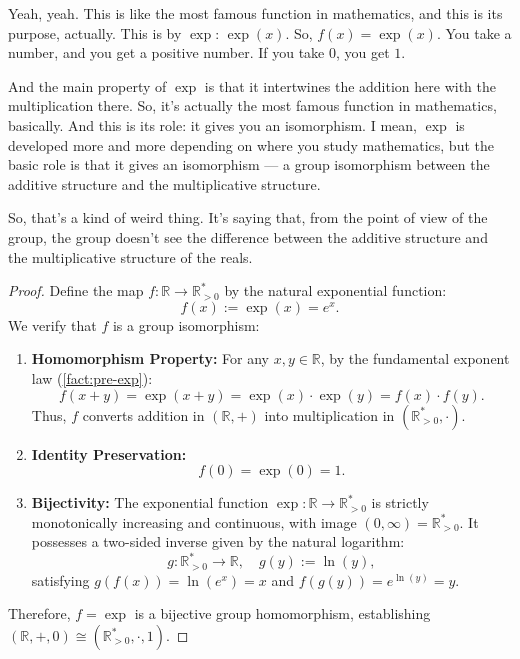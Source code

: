 \begin{speech}[00:18:32 - 00:19:27]
Yeah, yeah. This is like the most famous function in mathematics, and this is its purpose, actually. This is by $\exp$:  $\exp(x)$. So, $f(x) = \exp(x)$.  You take a number, and you get a positive number. If you take $0$, you get $1$.

And the main property of $\exp$ is that it intertwines the addition here with the multiplication there. So, it's actually the most famous function in mathematics, basically. And this is its role: it gives you an isomorphism. I mean, $\exp$ is developed more and more depending on where you study mathematics, but the basic role is that it gives an isomorphism --- a group isomorphism between the additive structure and the multiplicative structure.

So, that's a kind of weird thing. It's saying that, from the point of view of the group, the group doesn't see the difference between the additive structure and the multiplicative structure of the reals.
\end{speech}

\begin{content}

\begin{proof}
Define the map $f \colon \mathbb{R} \to \mathbb{R}^*_{>0}$ by the natural exponential function:
\[
f(x) := \exp(x) = e^x.
\]
We verify that $f$ is a group isomorphism:
\begin{enumerate}[label=\textbf{(\roman*)}]
    \item \textbf{Homomorphism Property:} For any $x, y \in \mathbb{R}$, by the fundamental exponent law (\cref{fact:pre-exp}):
    \[
    f(x + y) = \exp(x + y) = \exp(x) \cdot \exp(y) = f(x) \cdot f(y).
    \]
    Thus, $f$ converts addition in $(\mathbb{R}, +)$ into multiplication in $(\mathbb{R}^*_{>0}, \cdot)$.
    \item \textbf{Identity Preservation:}
    \[
    f(0) = \exp(0) = 1.
    \]
    \item \textbf{Bijectivity:} The exponential function $\exp \colon \mathbb{R} \to \mathbb{R}^*_{>0}$ is strictly monotonically increasing and continuous, with image $(0, \infty) = \mathbb{R}^*_{>0}$. It possesses a two-sided inverse given by the natural logarithm:
    \[
    g \colon \mathbb{R}^*_{>0} \to \mathbb{R}, \quad g(y) := \ln(y),
    \]
    satisfying $g(f(x)) = \ln(e^x) = x$ and $f(g(y)) = e^{\ln(y)} = y$.
\end{enumerate}
Therefore, $f = \exp$ is a bijective group homomorphism, establishing $(\mathbb{R}, +, 0) \cong (\mathbb{R}^*_{>0}, \cdot, 1)$.
\end{proof}
\end{content}

